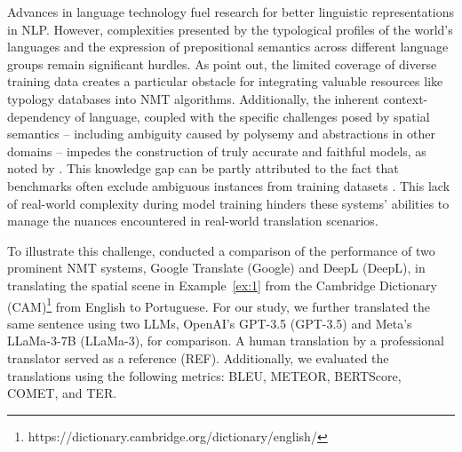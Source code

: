Advances in language technology fuel research for better linguistic representations in NLP. However, complexities presented by the typological profiles of the world's languages and the expression of prepositional semantics across different language groups remain significant hurdles. As \textcite{oncevay-etal-2020-bridging} point out, the limited coverage of diverse training data creates a particular obstacle for integrating valuable resources like typology databases into NMT algorithms. Additionally, the inherent context-dependency of language, coupled with the specific challenges posed by spatial semantics -- including ambiguity caused by polysemy and abstractions in other domains -- impedes the construction of truly accurate and faithful models, as noted by \textcite[p.5]{herskovits1986language}. This knowledge gap can be partly attributed to the fact that benchmarks often exclude ambiguous instances from training datasets \parencite{Beigman-Klebanov2009}. This lack of real-world complexity during model training hinders these systems' abilities to manage the nuances encountered in real-world translation scenarios.

To illustrate this challenge, \textcite{fernandes-etal-2024-spatial} conducted a comparison of the performance of two prominent NMT systems, Google Translate (Google) and DeepL (DeepL), in translating the spatial scene in Example~\ref{ex:1} from the Cambridge Dictionary (CAM)\footnote{https://dictionary.cambridge.org/dictionary/english/} from English to Portuguese. For our study, we further translated the same sentence using two LLMs, OpenAI's GPT-3.5 (GPT-3.5) and Meta's LLaMa-3-7B (LLaMa-3), for comparison. A human translation by a professional translator served as a reference (REF). Additionally, we evaluated the translations using the following metrics: BLEU, METEOR, BERTScore, COMET, and TER.

